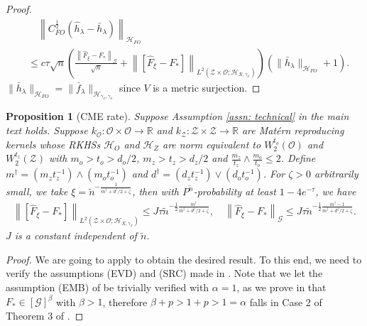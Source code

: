 \documentclass[11pt]{article}
\newcommand{\stageonesamples}{\tilde{n}}
\newcommand{\meffective}{m^{\dag}}
\newcommand{\deffective}{d^{\dag}}
\newcommand{\calZ}{\mathcal{Z}}
\newcommand{\calH}{\mathcal{H}}
\newcommand{\calG}{\mathcal{G}}
\newcommand{\calO}{\mathcal{O}}
\newcommand{\R}{\mathbb{R}}
\newcommand{\0}{\mathbf{0}}
\newtheorem{prop}{Proposition}[section]
\begin{document}
\begin{appendix}
\begin{proof}
\begin{align*}
    &\quad \left\|C_{FO}^{\frac{1}{2}}\left(\hat{h}_{\lambda} - \bar{h}_{\lambda}\right)\right\|_{\calH_{FO}} \\
    &\leq c \tau\sqrt{n}\left(\frac{\left\| \hat{F}_{\xi} -F_\ast \right\|_{\calG}}{\sqrt{n}} + \left\| \left[\hat{F}_\xi -F_*\right] \right\|_{L^2\left(\calZ\times\calO; \mathcal{H}_{X,\gamma_x}\right)}\right)\left(\|\bar{h}_\lambda\|_{\mathcal{H}_{FO}} + 1\right).
\end{align*}
$\|\bar{h}_\lambda\|_{\mathcal{H}_{FO}} = \|\bar{f}_{\lambda}\|_{\calH_{\gamma_x,\gamma_o}}$ since $V$ is a metric surjection.  
\end{proof}

\begin{prop}[CME rate]\label{prop:cme_rate}
Suppose Assumption \ref{assn: technical} in the main text holds. Suppose $k_\calO: \calO\times\calO \to \R$ and $k_\calZ: \calZ\times\calZ \to \R$ are Mat\'{e}rn reproducing kernels whose RKHSs $\calH_O$ and $\calH_Z$ are norm equivalent to $W_2^{t_o}(\calO)$ and $W_2^{t_z}(\calZ)$ with $m_o > t_o > d_o/2$, $m_z > t_z > d_z/2$ and $\frac{m_z}{t_z} \wedge \frac{m_o}{t_o} \leq 2$. Define $\meffective=(m_z t_z^{-1}) \wedge (m_o t_o^{-1})$ and $\deffective= (d_z t_z^{-1}) \vee(d_o t_o^{-1})$. 
For $\zeta > 0$ arbitrarily small, we take $\xi = \stageonesamples^{-\frac{1}{\meffective + \deffective/2 + \zeta}}$, then with $P^{\tilde{n}}$-probability at least $1- 4e^{-\tau}$, we have
\begin{align*}
    \left\|\left[\hat{F}_\xi -F_*\right]\right\|_{L^2(\calZ\times\calO; \calH_{X,\gamma_x})} \leq J\tau \stageonesamples^{-\frac{1}{2}\frac{ \meffective}{\meffective + \deffective/2 + \zeta}} , \quad \left\|\hat{F}_\xi -F_*\right\|_{\calG} \leq J \tau \stageonesamples^{-\frac{1}{2}\frac{\meffective - 1}{\meffective + \deffective/2 + \zeta}} .
\end{align*}
$J$ is a constant independent of $\tilde{n}$.
\end{prop}
\begin{proof}
We are going to apply \citet[Theorem 3]{JMLR:v25:23-1663} to obtain the desired result. To this end, we need to verify the assumptions (EVD) and (SRC) made in \cite{JMLR:v25:23-1663}. Note that we let the assumption (EMB) of \cite{JMLR:v25:23-1663} be trivially verified with $\alpha = 1$, as we prove in  that $F_{\ast} \in [\calG]^\beta$ with $\beta > 1$, therefore $\beta + p > 1 + p > 1 = \alpha$ falls in Case 2 of Theorem 3 of \cite{JMLR:v25:23-1663}. 


\end{proof}
\end{appendix}
\end{document}
